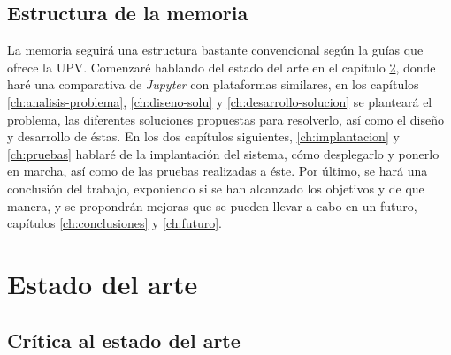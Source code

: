 \documentclass[11pt,spanish,listoffigures,listoftables]{tfgetsinf}
\begin{document}

\section{Estructura de la memoria}
\label{sec:estructura}

La memoria seguirá una estructura bastante convencional según la guías que ofrece la UPV. Comenzaré hablando del estado del arte en el capítulo \ref{ch:state-of-art}, donde haré una comparativa de \textit{Jupyter} con plataformas similares, en los capítulos \ref{ch:analisis-problema}, \ref{ch:diseno-solu} y \ref{ch:desarrollo-solucion} se planteará el problema, las diferentes soluciones propuestas para resolverlo, así como el diseño y desarrollo de éstas. En los dos capítulos siguientes, \ref{ch:implantacion} y \ref{ch:pruebas} hablaré de la implantación del sistema, cómo desplegarlo y ponerlo en marcha, así como de las pruebas realizadas a éste. Por último, se hará una conclusión del trabajo, exponiendo si se han alcanzado los objetivos y de que manera, y se propondrán mejoras que se pueden llevar a cabo en un futuro, capítulos \ref{ch:conclusiones} y \ref{ch:futuro}. 








\chapter{Estado del arte}
\label{ch:state-of-art}


\section{Crítica al estado del arte}
\label{sec:critica-estado}
\end{document}
